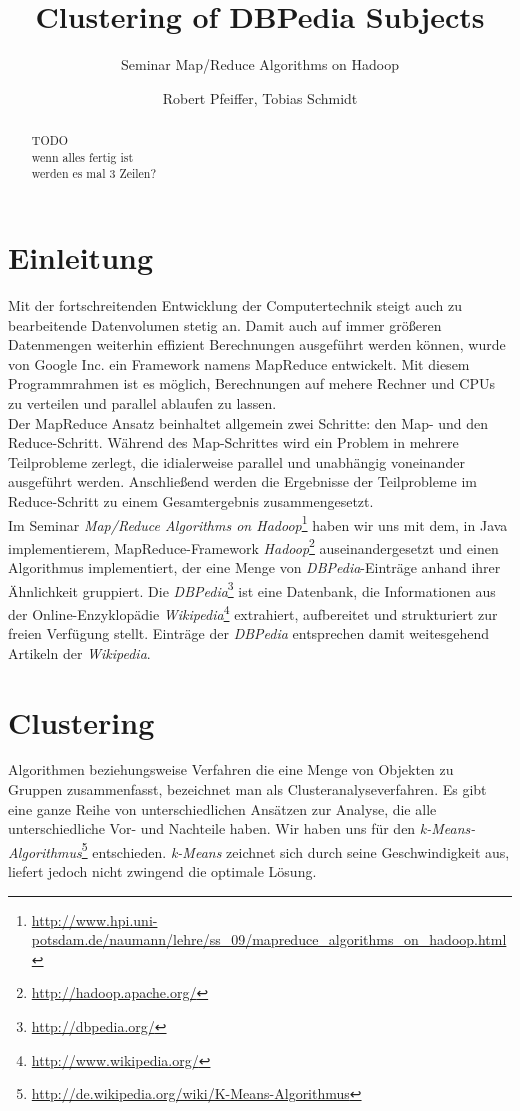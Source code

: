 \documentclass[a4paper]{llncs}
\title{Clustering of DBPedia Subjects}
\subtitle{Seminar Map/Reduce Algorithms on Hadoop}
\author{Robert Pfeiffer, Tobias Schmidt}
\institute{Fachgebiet Informationssysteme\\Hasso-Plattner-Institut für Softwaresystemtechnik\\Prof.-Dr.-Helmert-Str. 2-3\\14482 Potsdam, Deutschland\\August 2009}
\begin{document}
\maketitle
\begin{abstract}
TODO\\
wenn alles fertig ist\\
werden es mal 3 Zeilen?
\end{abstract}

\section{Einleitung}
Mit der fortschreitenden Entwicklung der Computertechnik steigt auch zu bearbeitende Datenvolumen stetig an. Damit auch auf immer größeren Datenmengen weiterhin effizient Berechnungen ausgeführt werden können, wurde von Google Inc. ein Framework namens MapReduce entwickelt. Mit diesem Programmrahmen ist es möglich, Berechnungen auf mehere Rechner und CPUs zu verteilen und parallel ablaufen zu lassen.\\
Der MapReduce Ansatz beinhaltet allgemein zwei Schritte: den Map- und den Reduce-Schritt. Während des Map-Schrittes wird ein Problem in mehrere Teilprobleme zerlegt, die idialerweise parallel und unabhängig voneinander ausgeführt werden. Anschließend werden die Ergebnisse der Teilprobleme im Reduce-Schritt zu einem Gesamtergebnis zusammengesetzt.\\
Im Seminar \emph{Map/Reduce Algorithms on Hadoop}\footnote{\url{http://www.hpi.uni-potsdam.de/naumann/lehre/ss_09/mapreduce_algorithms_on_hadoop.html}} haben wir uns mit dem, in Java implementierem, MapReduce-Framework \emph{Hadoop}\footnote{\url{http://hadoop.apache.org/}} auseinandergesetzt und einen Algorithmus implementiert, der eine Menge von \emph{DBPedia}-Einträge anhand ihrer Ähnlichkeit gruppiert. Die \emph{DBPedia}\footnote{\url{http://dbpedia.org/}} ist eine Datenbank, die Informationen aus der Online-Enzyklopädie \emph{Wikipedia}\footnote{\url{http://www.wikipedia.org/}} extrahiert, aufbereitet und strukturiert zur freien Verfügung stellt. Einträge der \emph{DBPedia} entsprechen damit weitesgehend Artikeln der \emph{Wikipedia}.

\section{Clustering}
Algorithmen beziehungsweise Verfahren die eine Menge von Objekten zu Gruppen zusammenfasst, bezeichnet man als Clusteranalyseverfahren. Es gibt eine ganze Reihe von unterschiedlichen Ansätzen zur Analyse, die alle unterschiedliche Vor- und Nachteile haben. Wir haben uns für den \emph{k-Means-Algorithmus}\footnote{\url{http://de.wikipedia.org/wiki/K-Means-Algorithmus}} entschieden. \emph{k-Means} zeichnet sich durch seine Geschwindigkeit aus, liefert jedoch nicht zwingend die optimale Lösung.\\
\end{document}
